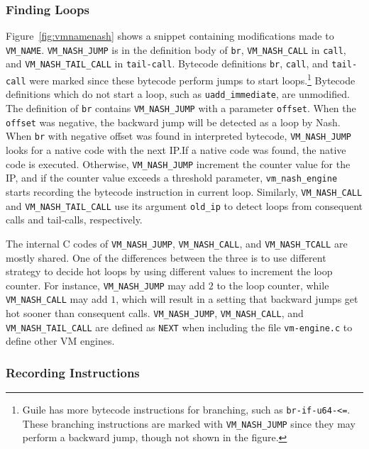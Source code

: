 \documentclass[preprint, 10pt]{sigplanconf}
\begin{document}
\subsubsection{Finding Loops}

Figure~\hyperref[fig:vmnamenash]{\ref{fig:vmnamenash}} shows a snippet
containing modifications made to \texttt{VM\_NAME}. \texttt{VM\_NASH\_JUMP} is
in the definition body of \texttt{br}, \texttt{VM\_NASH\_CALL} in
\texttt{call}, and \texttt{VM\_NASH\_TAIL\_CALL} in
\texttt{tail-call}. Bytecode definitions \texttt{br}, \texttt{call}, and
\texttt{tail-call} were marked since these bytecode perform jumps to start
loops.\footnote{Guile has more bytecode instructions for branching, such as
  \texttt{br-if-u64-<=}. These branching instructions are marked with
  \texttt{VM\_NASH\_JUMP} since they may perform a backward jump, though not
  shown in the figure.}  Bytecode definitions which do not start a loop, such
as \texttt{uadd\_immediate}, are unmodified. The definition of \texttt{br}
contains \texttt{VM\_NASH\_JUMP} with a parameter \texttt{offset}. When the
\texttt{offset} was negative, the backward jump will be detected as a loop by
Nash. When \texttt{br} with negative offset was found in interpreted bytecode,
\texttt{VM\_NASH\_JUMP} looks for a native code with the next IP.\@ If a
native code was found, the native code is executed. Otherwise,
\texttt{VM\_NASH\_JUMP} increment the counter value for the IP, and if the
counter value exceeds a threshold parameter, \texttt{vm\_nash\_engine} starts
recording the bytecode instruction in current loop.  Similarly,
\texttt{VM\_NASH\_CALL} and \texttt{VM\_NASH\_TAIL\_CALL} use its argument
\texttt{old\_ip} to detect loops from consequent calls and tail-calls,
respectively.\@

The internal C codes of \texttt{VM\_NASH\_JUMP}, \texttt{VM\_NASH\_CALL}, and
\texttt{VM\_NASH\_TCALL} are mostly shared. One of the differences between the
three is to use different strategy to decide hot loops by using different
values to increment the loop counter. For instance, \texttt{VM\_NASH\_JUMP}
may add $2$ to the loop counter, while \texttt{VM\_NASH\_CALL} may add $1$,
which will result in a setting that backward jumps get hot sooner than
consequent calls.  \texttt{VM\_NASH\_JUMP}, \texttt{VM\_NASH\_CALL}, and
\texttt{VM\_NASH\_TAIL\_CALL} are defined as \texttt{NEXT} when including the
file \texttt{vm-engine.c} to define other VM engines.

\subsubsection{Recording Instructions}
\end{document}
